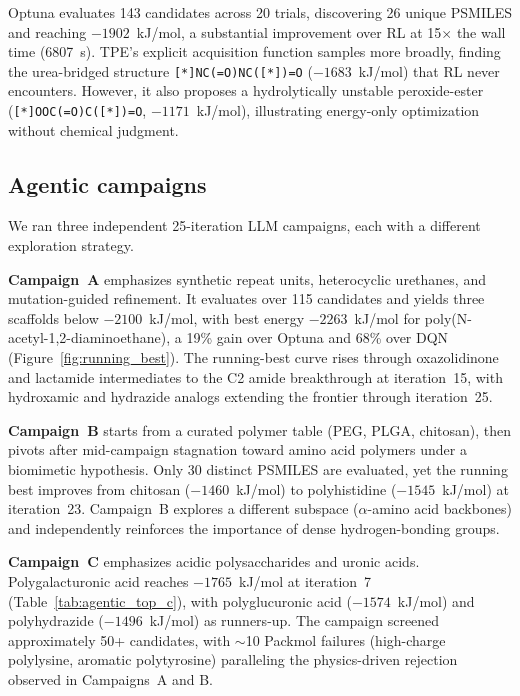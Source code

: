 \documentclass[twocolumn]{fairmeta}
\begin{document}
Optuna evaluates 143 candidates across 20 trials, discovering 26 unique PSMILES and reaching $-1902$~kJ/mol, a substantial improvement over RL at 15$\times$ the wall time (6807~s).
TPE's explicit acquisition function samples more broadly, finding the urea-bridged structure \texttt{[*]NC(=O)NC([*])=O} ($-1683$~kJ/mol) that RL never encounters.
However, it also proposes a hydrolytically unstable peroxide-ester (\texttt{[*]OOC(=O)C([*])=O}, $-1171$~kJ/mol), illustrating energy-only optimization without chemical judgment.

\subsection{Agentic campaigns}

We ran three independent 25-iteration LLM campaigns, each with a different exploration strategy.

\textbf{Campaign~A} emphasizes synthetic repeat units, heterocyclic urethanes, and mutation-guided refinement.
It evaluates over 115 candidates and yields three scaffolds below $-2100$~kJ/mol, with best energy $-2263$~kJ/mol for poly(N-acetyl-1,2-diaminoethane), a 19\% gain over Optuna and 68\% over DQN (Figure~\ref{fig:running_best}).
The running-best curve rises through oxazolidinone and lactamide intermediates to the C2 amide breakthrough at iteration~15, with hydroxamic and hydrazide analogs extending the frontier through iteration~25.

\textbf{Campaign~B} starts from a curated polymer table (PEG, PLGA, chitosan), then pivots after mid-campaign stagnation toward amino acid polymers under a biomimetic hypothesis.
Only 30 distinct PSMILES are evaluated, yet the running best improves from chitosan ($-1460$~kJ/mol) to polyhistidine ($-1545$~kJ/mol) at iteration~23.
Campaign~B explores a different subspace ($\alpha$-amino acid backbones) and independently reinforces the importance of dense hydrogen-bonding groups.

\textbf{Campaign~C} emphasizes acidic polysaccharides and uronic acids.
Polygalacturonic acid reaches $-1765$~kJ/mol at iteration~7 (Table~\ref{tab:agentic_top_c}), with polyglucuronic acid ($-1574$~kJ/mol) and polyhydrazide ($-1496$~kJ/mol) as runners-up.
The campaign screened approximately 50+ candidates, with ${\sim}$10 Packmol failures (high-charge polylysine, aromatic polytyrosine) paralleling the physics-driven rejection observed in Campaigns~A and B.
\end{document}
